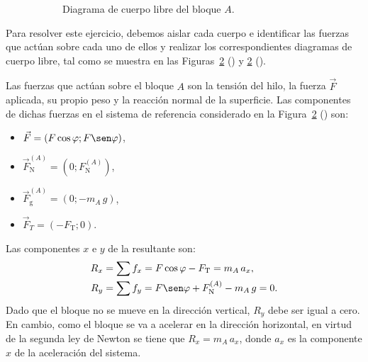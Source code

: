 \documentclass[addpoints]{exam}
\begin{document}
\begin{questions}
\begin{figure}[h]
\begin{subfigure}{0.45\textwidth}
            \caption{Diagrama de cuerpo libre del bloque $A$.}
            \label{fig:vinculados3_DCLA}
        \end{subfigure}
        \caption{}
        \label{fig:vinculados3}
    \end{figure}

    \begin{solution}
        Para resolver este ejercicio, debemos aislar cada cuerpo e identificar las fuerzas que actúan sobre cada uno de ellos y realizar los correspondientes diagramas de cuerpo libre, tal como se muestra en las Figuras~\ref{fig:vinculados3} () y \ref{fig:vinculados3} ().

        Las fuerzas que actúan sobre el bloque $A$ son la tensión del hilo, la fuerza $\vec{F}$ aplicada, su propio peso y la reacción normal de la superficie. Las componentes de dichas fuerzas en el sistema de referencia considerado en la Figura~\ref{fig:vinculados3} () son:
        \begin{itemize}
            \item $\vec{F} = \left(F \cos \varphi; F \sen \varphi\right)$,
            \item $\vec{F}_\text{N}^{(A)} = \left(0; F_\text{N}^{(A)}\right)$,
            \item $\vec{F}_\text{g}^{(A)} = \left(0; - m_A \, g\right)$,
            \item $\vec{F}_T = \left(-F_\text{T};0\right)$.
        \end{itemize} Las componentes $x$ e $y$ de la resultante son:
        \begin{align}
            R_x &= \sum f_x = F \cos \varphi - F_\text{T} = m_A \, a_x, \label{ec:sumfxA} \\
            R_y &= \sum f_y = F \sen \varphi + F_\text{N}^{(A)} - m_A \, g = 0. \label{ec:sumfyA}
        \end{align} Dado que el bloque no se mueve en la dirección vertical, $R_y$ debe ser igual a cero. En cambio, como el bloque se va a acelerar en la dirección horizontal, en virtud de la segunda ley de Newton se tiene que $R_x = m_A \, a_x$, donde $a_x$ es la componente $x$ de la aceleración del sistema.


\end{solution}
\end{questions}
\end{document}
